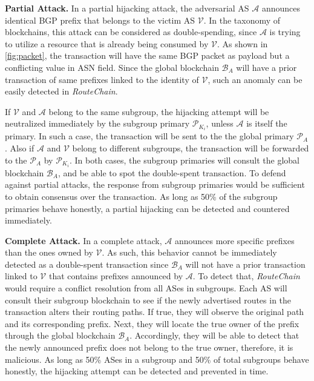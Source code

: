 \documentclass[conference]{IEEEtran}
\newcommand{\BfPara}[1]{{\noindent\bf#1.}\xspace}
\newcommand{\rc}{{{\em RouteChain}}\xspace}
\begin{document}
\BfPara{Partial Attack} In a partial hijacking attack, the adversarial AS $\mathcal{A}$ announces identical BGP prefix that belongs to the victim AS $\mathcal{V}$. In the taxonomy of blockchains, this attack can be considered as double-spending, since $\mathcal{A}$ is trying to utilize a resource that is already being consumed by $\mathcal{V}$. As shown in \autoref{fig:packet}, the transaction will have the same BGP packet as payload but a conflicting value in ASN field. Since the global blockchain $\mathcal{B}_{A}$ will have a prior transaction of same prefixes linked to the identity of $\mathcal{V}$, such an anomaly can be easily detected in \rc. 

If $\mathcal{V}$ and $\mathcal{A}$ belong to the same subgroup, the hijacking attempt will be neutralized immediately by the subgroup primary $\mathcal{P}_{K_{i}}$, unless $\mathcal{A}$ is itself the primary. In such a case, the transaction will be sent to the the global primary $\mathcal{P}_{A}$. Also if $\mathcal{A}$ and $\mathcal{V}$ belong to different subgroups, the transaction will be forwarded to the $\mathcal{P}_{A}$ by $\mathcal{P}_{K_{i}}$. In both cases, the subgroup primaries will consult the global blockchain $\mathcal{B}_{A}$, and be able to spot the double-spent transaction. To defend against partial attacks, the response from subgroup primaries would be sufficient to obtain consensus over the transaction. As long as 50\% of the subgroup primaries behave honestly, a partial hijacking can be detected and countered immediately.  

\BfPara{Complete Attack} In a complete attack, $\mathcal{A}$ announces more specific prefixes than the ones owned by $\mathcal{V}$. As such, this behavior cannot be immediately detected as a double-spent transaction since $\mathcal{B}_{A}$ will not have a prior transaction linked to $\mathcal{V}$ that contains prefixes announced by $\mathcal{A}$. To detect that, \rc would require a conflict resolution from all ASes in subgroups. Each AS will consult their subgroup blockchain to see if the newly advertised routes in the transaction alters their routing paths. If true, they will observe the original path and its corresponding prefix. Next, they will locate the true owner of the prefix through the global blockchain $\mathcal{B}_{A}$. Accordingly, they will be able to detect that the newly announced prefix does not belong to the true owner, therefore, it is malicious. As long as 50\% ASes in a subgroup and 50\% of total subgroups behave honestly, the hijacking attempt can be detected and prevented in time. 
\end{document}
